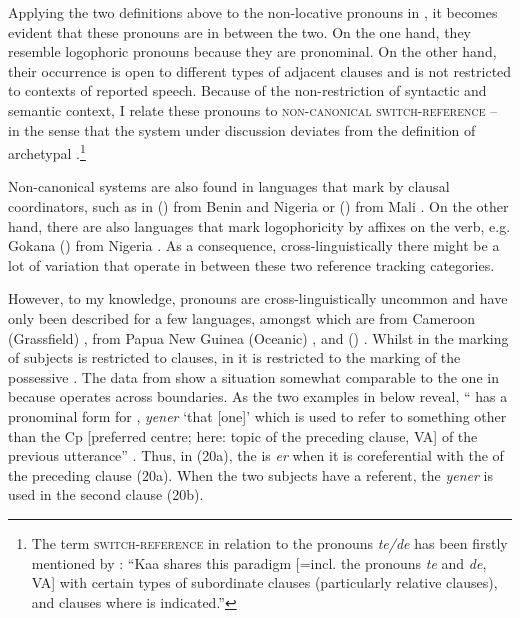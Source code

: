 \documentclass[output=paper
,newtxmath
,modfonts
,nonflat]{langsci/langscibook}
\begin{document}
Applying the two definitions above to the non-locative   pronouns in , it becomes evident that these pronouns are in between the two. On the one hand, they resemble logophoric pronouns because they are pronominal. On the other hand, their occurrence is open to different types of adjacent clauses and is not restricted to contexts of reported speech. Because of the non-restriction of syntactic and semantic context, I relate these pronouns to \textsc{non-canonical switch-reference} -- in the sense that the system under discussion deviates from the definition of archetypal .\footnote{The term \textsc{switch-reference} in relation to the pronouns \textit{te/de} has been firstly mentioned by \citet{Neely2013}: “Kaa shares this paradigm [=incl. the  pronouns \textit{te} and \textit{de}, VA] with certain types of subordinate clauses (particularly relative clauses), and clauses where  is indicated.”} 

Non-canonical systems are also found in languages that mark  by clausal coordinators, such as in  () from Benin and Nigeria \citep[113f]{LefebvreBrousseau02} or  () from Mali \citep[602ff]{Carlson1994}. On the other hand, there are also languages that mark logophoricity by affixes on the verb, e.g. Gokana () from Nigeria \citep{HymanComrie81}. As a consequence, cross-linguistically there might be a lot of variation that operate in between these two reference tracking categories.

However, to my knowledge,  pronouns are cross-linguistically uncommon and have only been described for a few languages, amongst which are  from Cameroon (Grassfield) \citep[53]{Wiesemann82},  from Papua New Guinea (Oceanic) \citep[391]{Crowleyetal11}, and  () \citep[311]{Prince2006}. Whilst in  the  marking of subjects is restricted to  clauses, in  it is restricted to the marking of the possessive . The data from  show a situation somewhat comparable to the one in  because  operates across  boundaries. As the two examples in  below reveal, “ has a pronominal form for , \textit{yener} ‘that [one]’ which is used to refer to something other than the Cp [preferred centre; here: topic of the preceding clause, VA] of the previous utterance” \citep[311]{Prince2006}. Thus, in (20a), the  is \textit{er} when it is coreferential with the  of the preceding clause (20a). When the two subjects have a  referent, the  \textit{yener} is used in the second clause (20b).
\end{document}

